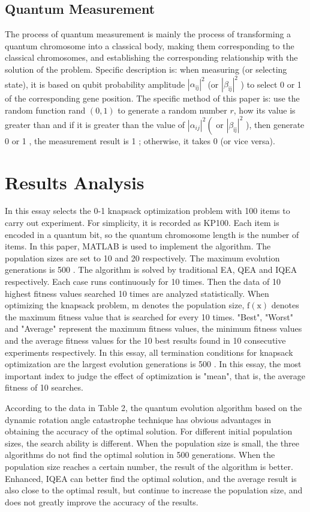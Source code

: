 \documentclass[10pt]{article}
\begin{document}
\subsection{Quantum Measurement}
The process of quantum measurement is mainly the process of transforming a quantum chromosome into a classical body, making them corresponding to the classical chromosomes, and establishing the corresponding relationship with the solution of the problem. Specific description is: when measuring (or selecting state), it is based on qubit probability amplitude $\left|\alpha_{\mathrm{ij}}\right|^{2}$ (or $\left|\beta_{\mathrm{ij}}\right|^{2}$ ) to select 0 or 1 of the corresponding gene position. The specific method of this paper is: use the random function rand $(0,1)$ to generate a random number $r$, how its value is greater than and if it is greater than the value of $\left|\alpha_{i j}\right|^{2}\left(\right.$ or $\left|\beta_{\mathrm{ij}}\right|^{2}$ ), then generate 0 or 1 , the measurement result is 1 ; otherwise, it takes 0 (or vice versa).

\section{Results Analysis}
In this essay selects the 0-1 knapsack optimization problem with 100 items to carry out experiment. For simplicity, it is recorded as KP100. Each item is encoded in a quantum bit, so the quantum chromosome length is the number of items. In this paper, MATLAB is used to implement the algorithm. The population sizes are set to 10 and 20 respectively. The maximum evolution generations is 500 . The algorithm is solved by traditional EA, QEA and IQEA respectively. Each case runs continuously for 10 times. Then the data of 10 highest fitness values searched 10 times are analyzed statistically. When optimizing the knapsack problem, m denotes the population size, $\mathrm{f}(\mathrm{x})$ denotes the maximum fitness value that is searched for every 10 times. "Best", "Worst" and "Average" represent the maximum fitness values, the minimum fitness values and the average fitness values for the 10 best results found in 10 consecutive experiments respectively. In this essay, all termination conditions for knapsack optimization are the largest evolution generations is 500 . In this essay, the most important index to judge the effect of optimization is "mean", that is, the average fitness of 10 searches.

According to the data in Table 2, the quantum evolution algorithm based on the dynamic rotation angle catastrophe technique has obvious advantages in obtaining the accuracy of the optimal solution. For different initial population sizes, the search ability is different. When the population size is small, the three algorithms do not find the optimal solution in 500 generations. When the population size reaches a certain number, the result of the algorithm is better. Enhanced, IQEA can better find the optimal solution, and the average result is also close to the optimal result, but continue to increase the population size, and does not greatly improve the accuracy of the results.
\end{document}

